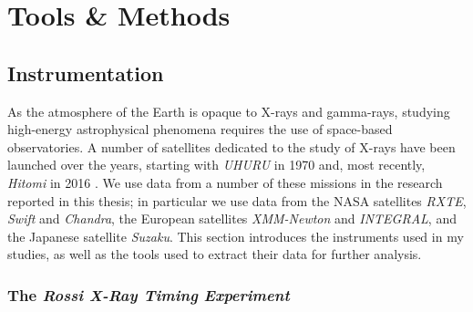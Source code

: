 \chapter{Tools \& Methods}

\section{Instrumentation}

\par As the atmosphere of the Earth is opaque to X-rays and gamma-rays, studying high-energy astrophysical phenomena requires the use of space-based observatories.  A number of satellites dedicated to the study of X-rays have been launched over the years, starting with \textit{UHURU} in 1970 \citep{Giacconi_Uhuru} and, most recently, \textit{Hitomi} in 2016 \citep{Takahashi_Hitomi}.  We use data from a number of these missions in the research reported in this thesis; in particular we use data from the NASA satellites \textit{RXTE}, \textit{Swift} and \textit{Chandra}, the European satellites \textit{XMM-Newton} and \textit{INTEGRAL}, and the Japanese satellite \textit{Suzaku}.  This section introduces the instruments used in my studies, as well as the tools used to extract their data for further analysis.

\subsection{The \textit{Rossi X-Ray Timing Experiment}}

